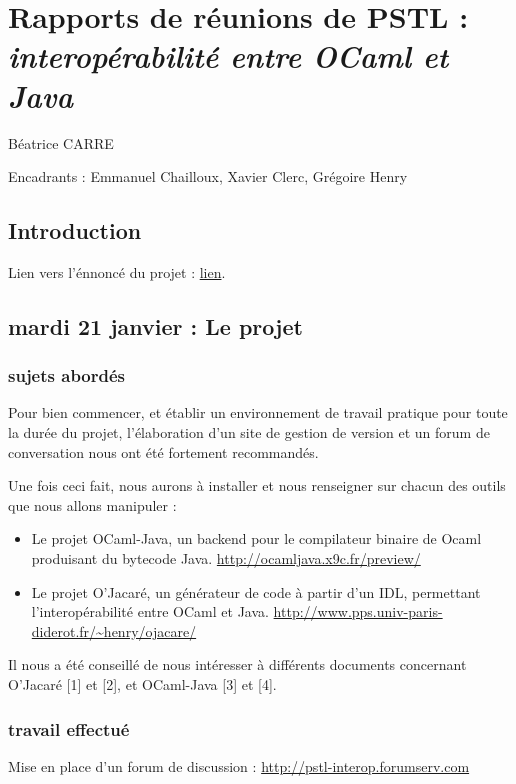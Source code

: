 \documentclass[a4paper, 11pt]{report}
\begin{document}
\chapter{Rapports de réunions de PSTL : \emph{interopérabilité entre OCaml et Java}}

Béatrice CARRE

Encadrants : Emmanuel Chailloux, Xavier Clerc, Grégoire Henry

\section*{Introduction}
Lien vers l'énnoncé du projet : 
\href{https://www-master.ufr-info-p6.jussieu.fr/2013/interoperabilite-entre-OCaml-et}{lien}.






\section{mardi 21 janvier : Le projet}
\subsection{sujets abordés}

Pour bien commencer, et établir un environnement de travail pratique
pour toute la durée du projet, l'élaboration d'un site de gestion de
version et un forum de conversation nous ont été fortement
recommandés.

Une fois ceci fait, nous aurons à installer et nous renseigner sur chacun des
outils que nous allons manipuler :
\begin{itemize}
\item Le projet OCaml-Java, un backend pour le compilateur binaire de Ocaml produisant du bytecode Java. \url{http://ocamljava.x9c.fr/preview/}
\item Le projet O'Jacaré, un générateur de code à partir d'un IDL, permettant l'interopérabilité entre OCaml et Java. \url{http://www.pps.univ-paris-diderot.fr/~henry/ojacare/}
\end{itemize}
Il nous a été conseillé de nous intéresser à différents documents
concernant O'Jacaré [1] et [2], et OCaml-Java [3] et [4].

\subsection{travail effectué}
Mise en place d'un forum de discussion :
\url{http://pstl-interop.forumserv.com}
\end{document}
